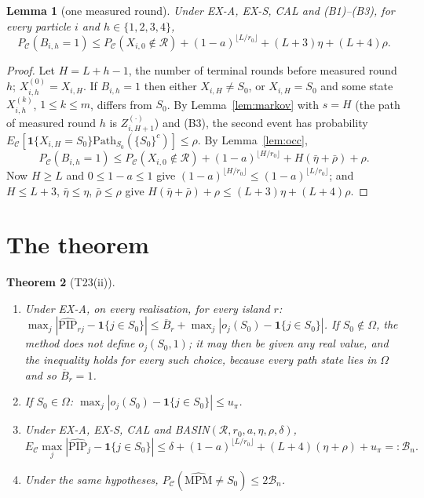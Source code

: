 \documentclass[11pt]{article}
\newtheorem{theorem}{Theorem}
\newtheorem{lemma}[theorem]{Lemma}
\theoremstyle{remark}
\newcommand{\one}{\mathbf 1}
\newcommand{\R}{\mathcal R}
\newcommand{\C}{\mathcal C}
\newcommand{\PIP}{\widehat{\mathrm{PIP}}}
\newcommand{\Pc}{P_{\C}}
\newcommand{\Ec}{E_{\C}}
\begin{document}
\begin{lemma}[one measured round]\label{lem:round}
Under EX-A, EX-S, CAL and (B1)--(B3), for every particle $i$ and $h\in\{1,2,3,4\}$,
\[
\Pc(B_{i,h}=1)\le\Pc(X_{i,0}\notin\R)+(1-a)^{\lfloor L/r_0\rfloor}+(L+3)\eta+(L+4)\rho .
\]
\end{lemma}

\begin{proof}
Let $H=L+h-1$, the number of terminal rounds before measured round $h$; $X^{(0)}_{i,h}=X_{i,H}$. If $B_{i,h}=1$ then either $X_{i,H}\ne S_0$, or $X_{i,H}=S_0$ and some state $X^{(k)}_{i,h}$, $1\le k\le m$, differs from $S_0$. By Lemma~\ref{lem:markov} with $s=H$ (the path of measured round $h$ is $Z^{(\cdot)}_{i,H+1}$) and (B3), the second event has probability $\Ec[\one\{X_{i,H}=S_0\}\mathrm{Path}_{S_0}(\{S_0\}^c)]\le\rho$. By Lemma~\ref{lem:occ},
\[
\Pc(B_{i,h}=1)\le\Pc(X_{i,0}\notin\R)+(1-a)^{\lfloor H/r_0\rfloor}+H(\bar\eta+\bar\rho)+\rho .
\]
Now $H\ge L$ and $0\le1-a\le1$ give $(1-a)^{\lfloor H/r_0\rfloor}\le(1-a)^{\lfloor L/r_0\rfloor}$; and $H\le L+3$, $\bar\eta\le\eta$, $\bar\rho\le\rho$ give $H(\bar\eta+\bar\rho)+\rho\le(L+3)\eta+(L+4)\rho$.
\end{proof}

\section{The theorem}

\begin{theorem}[T23(ii)]\label{thm:main}
\begin{enumerate}[label=(\alph*)]
\item Under EX-A, on every realisation, for every island $r$: $\displaystyle\max_j|\PIP_{rj}-\one\{j\in S_0\}|\le\overline B_r+\max_j|o_j(S_0)-\one\{j\in S_0\}|$. If $S_0\notin\Omega$, the method does not define $o_j(S_0,1)$; it may then be given any real value, and the inequality holds for every such choice, because every path state lies in $\Omega$ and so $\overline B_r=1$.
\item If $S_0\in\Omega$: $\max_j|o_j(S_0)-\one\{j\in S_0\}|\le u_\pi$.
\item Under EX-A, EX-S, CAL and BASIN$(\R,r_0,a,\eta,\rho,\delta)$,
\[
\Ec\max_j|\PIP_j-\one\{j\in S_0\}|\le\delta+(1-a)^{\lfloor L/r_0\rfloor}+(L+4)(\eta+\rho)+u_\pi=:\mathcal B_n .
\]
\item Under the same hypotheses, $\Pc(\widehat{\mathrm{MPM}}\neq S_0)\le2\mathcal B_n$.
\end{enumerate}
\end{theorem}
\end{document}
